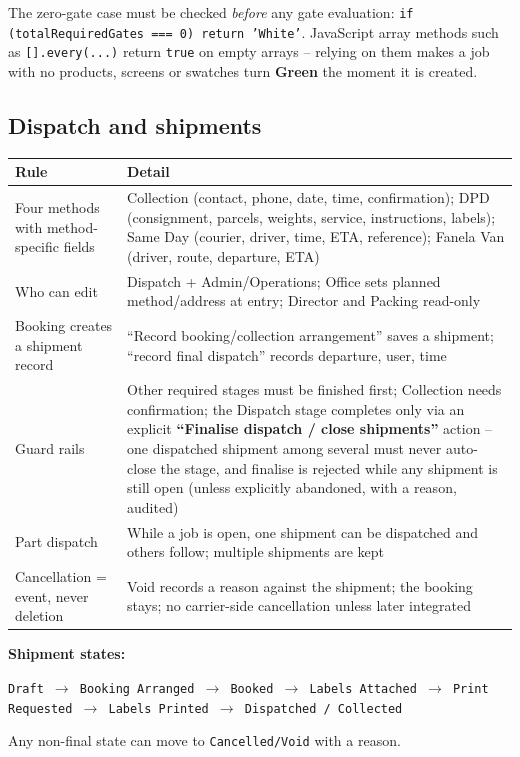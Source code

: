 \begin{warningbox}[title={Developer note: empty-job trap}]
  The zero-gate case must be checked \emph{before} any gate evaluation:
  \texttt{if (totalRequiredGates === 0) return 'White'}. JavaScript array methods such as
  \texttt{[].every(...)} return \texttt{true} on empty arrays -- relying on them makes a
  job with no products, screens or swatches turn \textbf{Green} the moment it is created.
\end{warningbox}

\subsection{Dispatch and shipments}

\begin{tabularx}{\textwidth}{@{}X X@{}}
\toprule
\textbf{Rule} & \textbf{Detail} \\
\midrule
Four methods with method-specific fields &
  Collection (contact, phone, date, time, confirmation); DPD (consignment, parcels,
  weights, service, instructions, labels); Same Day (courier, driver, time, ETA,
  reference); Fanela Van (driver, route, departure, ETA) \\
Who can edit & Dispatch + Admin/Operations; Office sets planned method/address at entry;
  Director and Packing read-only \\
Booking creates a shipment record & ``Record booking/collection arrangement'' saves a
  shipment; ``record final dispatch'' records departure, user, time \\
Guard rails & Other required stages must be finished first; Collection needs
  confirmation; the Dispatch stage completes only via an explicit \textbf{``Finalise
  dispatch / close shipments''} action -- one dispatched shipment among several must
  never auto-close the stage, and finalise is rejected while any shipment is still open
  (unless explicitly abandoned, with a reason, audited) \\
Part dispatch & While a job is open, one shipment can be dispatched and others follow;
  multiple shipments are kept \\
Cancellation = event, never deletion & Void records a reason against the shipment; the
  booking stays; no carrier-side cancellation unless later integrated \\
\bottomrule
\end{tabularx}

\textbf{Shipment states:}
\begin{center}
\texttt{Draft $\rightarrow$ Booking Arranged $\rightarrow$ Booked $\rightarrow$ Labels
Attached $\rightarrow$ Print Requested $\rightarrow$ Labels Printed $\rightarrow$
Dispatched / Collected}
\end{center}
Any non-final state can move to \texttt{Cancelled/Void} with a reason.

